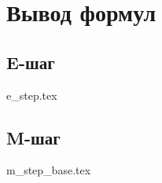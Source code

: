 \documentclass[unicode]{article}
\begin{document}
	\section{Вывод формул}
	
		\subsection{E-шаг}
		{e_step.tex}
		
		\subsection{M-шаг}
		{m_step_base.tex}
\end{document}
